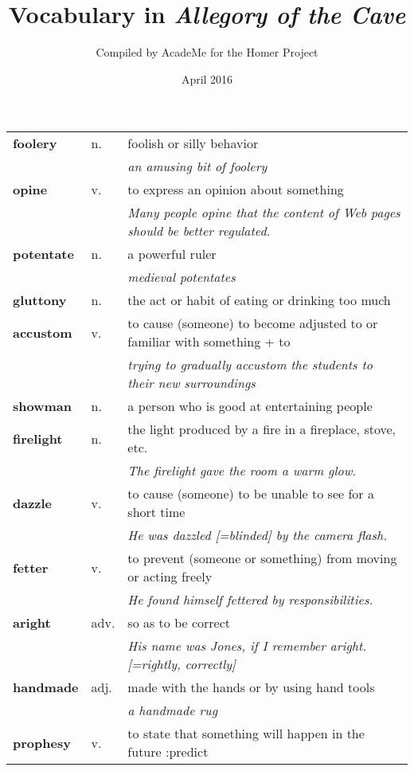 \documentclass[a4paper]{article}
\title{Vocabulary in \textit{Allegory of the Cave}}
\author{Compiled by AcadeMe for the Homer Project}
\date{April 2016}
\begin{document}
\maketitle
\begin{longtable}{llp{11cm}}
\textbf{foolery} & n. &  foolish or silly behavior \\
 & & \textit{an amusing bit of foolery}\\[0.08cm]
\textbf{opine} & v. &  to express an opinion about something \\
 & & \textit{Many people opine that the content of Web pages should be better regulated.}\\[0.08cm]
\textbf{potentate} & n. &  a powerful ruler \\
 & & \textit{medieval potentates}\\[0.08cm]
\textbf{gluttony} & n. &  the act or habit of eating or drinking too much\\[0.08cm]
\textbf{accustom} & v. &  to cause (someone) to become adjusted to or familiar with something + to \\
 & & \textit{trying to gradually accustom the students to their new surroundings}\\[0.08cm]
\textbf{showman} & n. &  a person who is good at entertaining people\\[0.08cm]
\textbf{firelight} & n. &  the light produced by a fire in a fireplace, stove, etc. \\
 & & \textit{The firelight gave the room a warm glow.}\\[0.08cm]
\textbf{dazzle} & v. &  to cause (someone) to be unable to see for a short time \\
 & & \textit{He was dazzled [=blinded] by the camera flash.}\\[0.08cm]
\textbf{fetter} & v. &  to prevent (someone or something) from moving or acting freely \\
 & & \textit{He found himself fettered by responsibilities.}\\[0.08cm]
\textbf{aright} & adv. &  so as to be correct \\
 & & \textit{His name was Jones, if I remember aright. [=rightly, correctly]}\\[0.08cm]
\textbf{handmade} & adj. &  made with the hands or by using hand tools \\
 & & \textit{a handmade rug}\\[0.08cm]
\textbf{prophesy} & v. &  to state that something will happen in the future :predict \\

\end{longtable}
\end{document}
